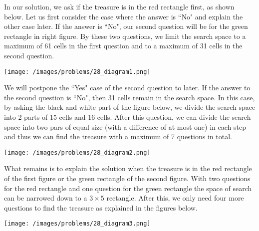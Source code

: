 \begin{solution}
In our solution, we ask if the treasure is in the  red rectangle first, as shown below. Let us first consider the case where the answer is ``No" and explain the other case later. If the answer is ``No", our second question will be for the green rectangle in right figure. By these two questions, we limit the search space to a maximum of 61 cells in the first question and to a maximum of 31 cells in the second question. 

\begin{center}
	\texttt{[image: /images/problems/28\_diagram1.png]}
\end{center}


 We will postpone the ``Yes" case of the second question to later. If the answer to the second question is ``No", then 31 cells remain in the search space. In this case, by asking the black and white part of the figure below, we divide the search space into 2 parts of 15 cells and 16 cells.  After this question, we can divide the search space into two pars of equal size (with a difference of at most one) in each step and thus we can find the treasure with a maximum of 7 questions in total.

\begin{center}
	\texttt{[image: /images/problems/28\_diagram2.png]}
\end{center}

 
 What remains is to explain the solution when the treasure is in the red rectangle of the first figure or the green rectangle of the second figure. With two questions for the red rectangle and one question for the green rectangle the space of search can be narrowed down to a  $3 \times 5$ rectangle. After this, we only need four more questions to find the treasure as explained in the figures below. 
 
\begin{center}
	\texttt{[image: /images/problems/28\_diagram3.png]}
\end{center}


\end{solution}